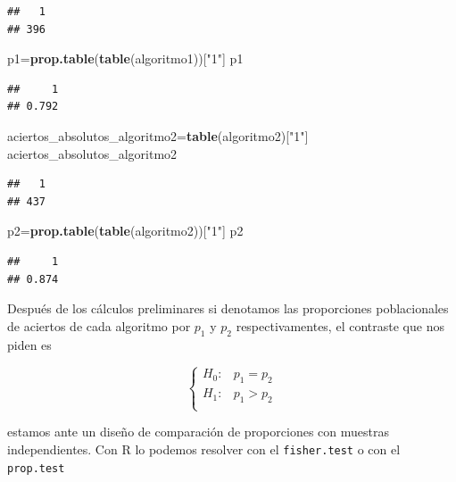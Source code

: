 \documentclass[
]{article}
\newenvironment{Shaded}{\begin{snugshade}}{\end{snugshade}}
\newcommand{\KeywordTok}[1]{\textcolor[rgb]{0.13,0.29,0.53}{\textbf{#1}}}
\newcommand{\NormalTok}[1]{#1}
\newcommand{\StringTok}[1]{\textcolor[rgb]{0.31,0.60,0.02}{#1}}
\begin{document}
\begin{verbatim}
##   1 
## 396
\end{verbatim}

\begin{Shaded}
\begin{Highlighting}[]
\NormalTok{p1=}\KeywordTok{prop.table}\NormalTok{(}\KeywordTok{table}\NormalTok{(algoritmo1))[}\StringTok{"1"}\NormalTok{]}
\NormalTok{p1}
\end{Highlighting}
\end{Shaded}

\begin{verbatim}
##     1 
## 0.792
\end{verbatim}

\begin{Shaded}
\begin{Highlighting}[]
\NormalTok{aciertos_absolutos_algoritmo2=}\KeywordTok{table}\NormalTok{(algoritmo2)[}\StringTok{"1"}\NormalTok{]}
\NormalTok{aciertos_absolutos_algoritmo2}
\end{Highlighting}
\end{Shaded}

\begin{verbatim}
##   1 
## 437
\end{verbatim}

\begin{Shaded}
\begin{Highlighting}[]
\NormalTok{p2=}\KeywordTok{prop.table}\NormalTok{(}\KeywordTok{table}\NormalTok{(algoritmo2))[}\StringTok{"1"}\NormalTok{]}
\NormalTok{p2}
\end{Highlighting}
\end{Shaded}

\begin{verbatim}
##     1 
## 0.874
\end{verbatim}

Después de los cálculos preliminares si denotamos las proporciones
poblacionales de aciertos de cada algoritmo por \(p_1\) y \(p_2\)
respectivamentes, el contraste que nos piden es

\[
\left\{
\begin{array}{ll}
H_0: & p_1=p_2\\
H_1: & p_1>p_2\\
\end{array}
\right.
\]

estamos ante un diseño de comparación de proporciones con muestras
independientes. Con R lo podemos resolver con el \texttt{fisher.test} o
con el \texttt{prop.test}
\end{document}

